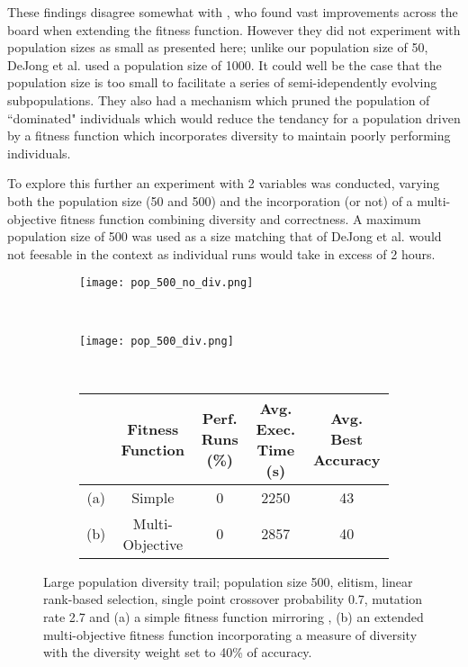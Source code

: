 These findings disagree somewhat with \cite{deJong:2001:RBP:2955239.2955241},
who found vast improvements across the board when extending the fitness
function. However they did not experiment with population sizes as small
as presented here; unlike our population size of 50, DeJong et al. used
a population size of 1000. It could well be the case that
the population size is too small to facilitate a series of semi-idependently
evolving subpopulations. They also had a mechanism which pruned the population
of ``dominated" individuals which would reduce the tendancy for a population
driven by a fitness function which incorporates diversity to maintain poorly
performing individuals.

To explore this further an experiment with 2 variables was conducted, varying
both the population size (50 and 500) and the incorporation (or not) of a
multi-objective fitness function combining diversity and correctness. A maximum
population size of 500 was used as a
size matching that of DeJong et al. would not feesable in the context as individual
runs would take in excess of 2 hours.

\begin{figure}
	\centering
	\begin{subfigure}[ht]{0.49\textwidth}
		\texttt{[image: pop\_500\_no\_div.png]}
		\caption{}
		\label{fig:500_no_div}
		\vspace{1em}
	\end{subfigure}
	~
	\begin{subfigure}[ht]{0.49\textwidth}
		\texttt{[image: pop\_500\_div.png]}
		\caption{}
		\label{fig:500_div}
		\vspace{1em}
	\end{subfigure}
	~
	\begin{subfigure}[ht]{\textwidth}
		\centering
		\begin{tabular}{ccccc}
			\toprule
			& \bfseries{Fitness Function} &
			\bfseries{Perf. Runs (\%)} &
			\bfseries{Avg. Exec. Time (s)} & \bfseries{Avg. Best Accuracy}\\
			\midrule
			(a) & Simple & 0 & 2250 & 43\\
			(b) & Multi-Objective & 0 & 2857 & 40\\
			\bottomrule
		\end{tabular}
	\end{subfigure}

	\caption[Large population diversity trail]{Large population diversity trail;
		population size 500, elitism, linear rank-based selection, single point
		crossover probability 0.7, mutation rate 2.7 and
		(a) a simple fitness function mirroring \cite{10.1007/3-540-63173-9_61},
		(b) an extended multi-objective fitness function incorporating a measure
		of diversity with the diversity weight set to 40\% of accuracy.}
	\label{fig:500}
\end{figure}

